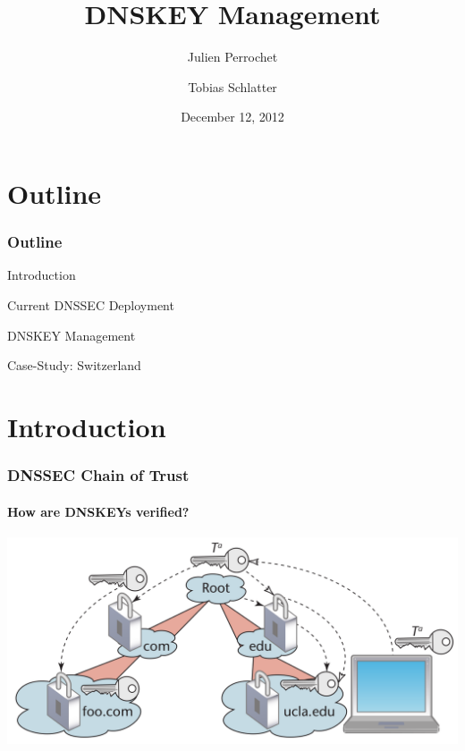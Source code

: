 \documentclass{beamer}
\title{DNSKEY Management}
\author{Julien Perrochet \and Tobias Schlatter}
\date{December 12, 2012}
\institute{ITSEC, EPFL, Prof. Janson}
\begin{document}
\begin{frame}
  \titlepage
\end{frame}

\section{Outline}
\begin{frame}
  \frametitle{Outline}

  \begin{block}{Introduction}
  \end{block}

  \begin{block}{Current DNSSEC Deployment}
  \end{block}

  \begin{block}{DNSKEY Management}
  \end{block}

  \begin{block}{Case-Study: Switzerland}
  \end{block}

\end{frame}

\section{Introduction}
\begin{frame}
  \frametitle{DNSSEC Chain of Trust}
  \framesubtitle{How are DNSKEYs verified?}

  \includegraphics[width=\textwidth]{trust-chain}

\end{frame}
\end{document}
